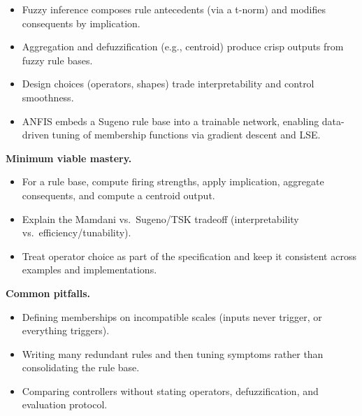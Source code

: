 \begin{tcolorbox}[summarybox, title={Key takeaways}]
\begin{itemize}
    \item Fuzzy inference composes rule antecedents (via a t\hyp{}norm) and modifies consequents by implication.
    \item Aggregation and defuzzification (e.g., centroid) produce crisp outputs from fuzzy rule bases.
    \item Design choices (operators, shapes) trade interpretability and control smoothness.
    \item ANFIS embeds a Sugeno rule base into a trainable network, enabling data-driven tuning of membership functions via gradient descent and LSE.
\end{itemize}

\medskip
\noindent\textbf{Minimum viable mastery.}
\begin{itemize}
    \item For a rule base, compute firing strengths, apply implication, aggregate consequents, and compute a centroid output.
    \item Explain the Mamdani vs.\ Sugeno/TSK tradeoff (interpretability vs.\ efficiency/tunability).
    \item Treat operator choice as part of the specification and keep it consistent across examples and implementations.
\end{itemize}

\noindent\textbf{Common pitfalls.}
\begin{itemize}
    \item Defining memberships on incompatible scales (inputs never trigger, or everything triggers).
    \item Writing many redundant rules and then tuning symptoms rather than consolidating the rule base.
    \item Comparing controllers without stating operators, defuzzification, and evaluation protocol.
\end{itemize}
\end{tcolorbox}

